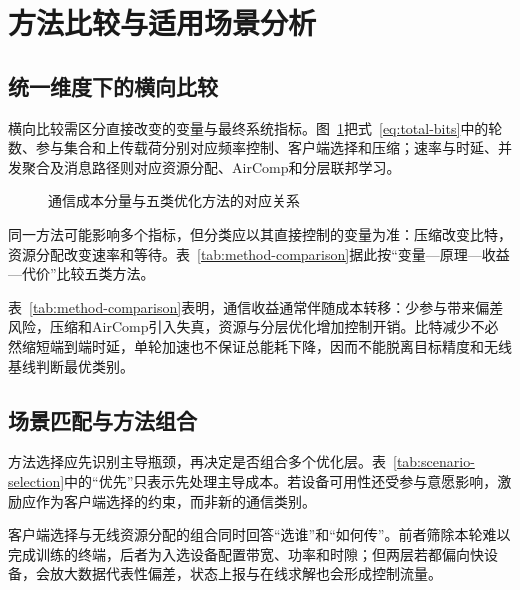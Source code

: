 \section{方法比较与适用场景分析}\label{sec:comparison}

\subsection{统一维度下的横向比较}\label{subsec:unified-comparison}

横向比较需区分直接改变的变量与最终系统指标。图~\ref{fig:communication-cost-map}把式~\eqref{eq:total-bits}中的轮数、参与集合和上传载荷分别对应频率控制、客户端选择和压缩；速率与时延、并发聚合及消息路径则对应资源分配、AirComp和分层联邦学习。

\begin{figure}[t]
  \centering
  \resizebox{0.96\textwidth}{!}{}
  \caption{通信成本分量与五类优化方法的对应关系\protect\cite{Lim2020MobileEdge,Zhang2023EdgeFLSurvey,Ge2025EfficientFLSurvey}}
  \label{fig:communication-cost-map}
\end{figure}

同一方法可能影响多个指标，但分类应以其直接控制的变量为准：压缩改变比特，资源分配改变速率和等待。表~\ref{tab:method-comparison}据此按“变量—原理—收益—代价”比较五类方法。



表~\ref{tab:method-comparison}表明，通信收益通常伴随成本转移：少参与带来偏差风险，压缩和AirComp引入失真，资源与分层优化增加控制开销。比特减少不必然缩短端到端时延，单轮加速也不保证总能耗下降\cite{Tran2019WirelessOptimization,Ge2025EfficientFLSurvey}，因而不能脱离目标精度和无线基线判断最优类别。

\subsection{场景匹配与方法组合}\label{subsec:scenario-matching}

方法选择应先识别主导瓶颈，再决定是否组合多个优化层。表~\ref{tab:scenario-selection}中的“优先”只表示先处理主导成本。若设备可用性还受参与意愿影响，激励应作为客户端选择的约束，而非新的通信类别\cite{Jia2023HierarchicalIncentive}。



客户端选择与无线资源分配的组合同时回答“选谁”和“如何传”。前者筛除本轮难以完成训练的终端，后者为入选设备配置带宽、功率和时隙；但两层若都偏向快设备，会放大数据代表性偏差，状态上报与在线求解也会形成控制流量\cite{Xu2021ClientBandwidth,Nishio2019FedCS}。

